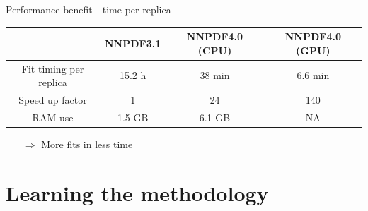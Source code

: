 \documentclass[aspectratio=169,10pt]{beamer}
\begin{document}
\begin{frame}{Performance benefit - time per replica}
\begin{table}
   \renewcommand{\arraystretch}{1.50}
	\centering
	\begin{tabular}{c | c | c | c} \toprule
	  & NNPDF3.1  & NNPDF4.0 (CPU) & NNPDF4.0  (GPU) \\
          \midrule
	  Fit timing per replica    & 15.2 h        & 38 min        & 6.6 min \\ \hline
           Speed up factor    & 1        &  24      & 140 \\ \hline
	  RAM use &  1.5 GB          &  6.1 GB                 & NA  \\ \bottomrule
	\end{tabular}
\end{table}
\vspace*{1em}
    \begin{itemize}
         \item[$\Rightarrow$] More fits in less time
    \end{itemize}
    
\end{frame}

\section*{Learning the methodology}
\end{document}
